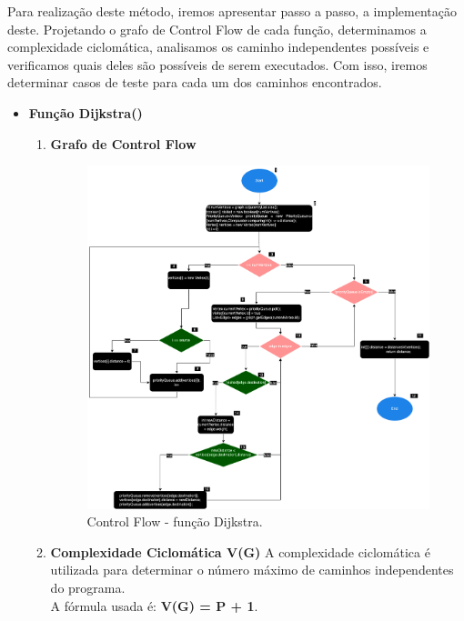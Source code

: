 \documentclass{article}
\begin{document}
\texttt{}\par Para realização deste método, iremos apresentar passo a passo, a implementação deste. Projetando o grafo de Control Flow de cada função, determinamos a complexidade ciclomática, analisamos os caminho independentes possíveis e verificamos quais deles são possíveis de serem executados. Com isso, iremos determinar casos de teste para cada um dos caminhos encontrados.
\clearpage
\begin{itemize}
    \item \textbf{Função Dijkstra()}
    
       
    \begin{enumerate}
        
        \item \textbf{Grafo de Control Flow}
    \begin{figure}[H]
    \centering
    \includegraphics[width=\textwidth]{Images/ControlFlowGraphDijkstra.png}
    \caption{Control Flow - função Dijkstra.} 
    \label{fig:ControlFlow-Dijkstra}

  \end{figure}


  \item \textbf{Complexidade Ciclomática V(G)}
  \quad A complexidade ciclomática é utilizada para determinar o número máximo de caminhos independentes do programa.\\
  \quad A fórmula usada é: \textbf{V(G) = P + 1}.\\


\end{enumerate}
\end{itemize}
\end{document}
